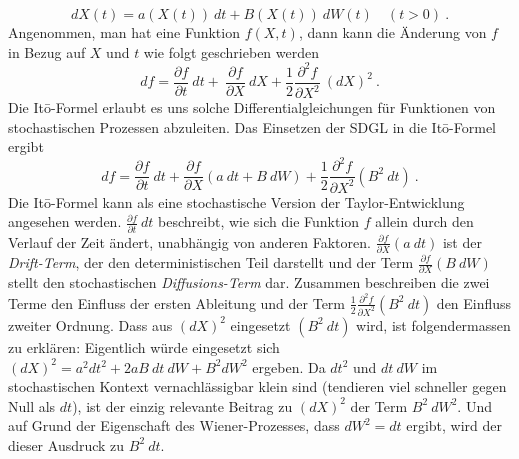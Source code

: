 \begin{equation}
	dX(t) = a(X(t)) \ dt + B(X(t)) \ dW(t) \quad (t>0) \ .
\end{equation}
Angenommen, man hat eine Funktion $ f(X,t) $, dann kann die Änderung von $ f $ in Bezug auf $ X $ und $ t $ wie folgt geschrieben werden
\begin{equation}
	df = \frac{\partial f}{\partial t} \ dt + \ \frac{\partial f}{\partial X} \ dX + \frac{1}{2} \frac{\partial^2 f} {\partial X^2} \ (dX)^2 \ .	
\end{equation}
Die Itō-Formel erlaubt es uns solche Differentialgleichungen für Funktionen von stochastischen Prozessen abzuleiten. Das Einsetzen der SDGL in die Itō-Formel ergibt
\begin{equation}
	df = \frac{\partial f}{\partial t} \ dt + \frac{\partial f}{\partial X} (a \ dt + B \ dW) + \frac{1}{2} \frac{\partial^2 f}{\partial X^2} (B^2 \ dt) \ .
\end{equation}
Die Itō-Formel kann als eine stochastische Version der Taylor-Entwicklung angesehen werden. $ \frac{\partial f}{\partial t} \ dt $ beschreibt, wie sich die Funktion $ f $ allein durch den Verlauf der Zeit ändert, unabhängig von anderen Faktoren. $ \frac{\partial f}{\partial X} (a \ dt) $ ist der \textit{Drift-Term}, der den deterministischen Teil darstellt und der Term $  \frac{\partial f}{\partial X} (B \ dW) $ stellt den stochastischen \textit{Diffusions-Term} dar. Zusammen beschreiben die zwei Terme den Einfluss der ersten Ableitung und der Term $ \frac{1}{2} \frac{\partial^2 f}{\partial X^2} (B^2 \ dt) $ den Einfluss zweiter Ordnung. Dass aus $ (dX)^2 $ eingesetzt $ (B^2 \ dt) $ wird, ist folgendermassen zu erklären:
Eigentlich würde eingesetzt sich $ (dX)^2 = a^2 dt^2 + 2a B \ dt \ dW + B^2 dW^2 $ ergeben. Da $ dt^2 $ und $ dt \ dW $ im stochastischen Kontext vernachlässigbar klein sind (tendieren viel schneller gegen Null als $ dt $), ist der einzig relevante Beitrag zu $ (dX)^2 $ der Term $ B^2 \ dW^2 $. Und auf Grund der Eigenschaft des Wiener-Prozesses, dass $ dW^2 = dt $ ergibt, wird der dieser Ausdruck zu $ B^2 \ dt $.



